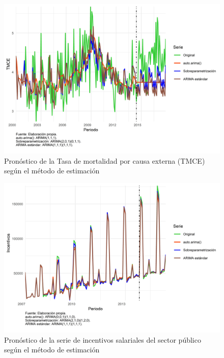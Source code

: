 \documentclass[
]{article}
\begin{document}
\begin{figure}[H]
\includegraphics[width=1\linewidth,height=1\textheight]{Tesis_files/figure-latex/pronostico_EXTERNA-1} \caption{Pronóstico de la Tasa de mortalidad por causa externa (TMCE) según el método de estimación}\label{fig:pronostico_EXTERNA}
\end{figure}

\begin{figure}[H]
\includegraphics[width=1\linewidth,height=1\textheight]{Tesis_files/figure-latex/pronostico_INCENTIVOS-1} \caption{Pronóstico de la serie de incentivos salariales del sector público según el método de estimación}\label{fig:pronostico_INCENTIVOS}
\end{figure}
\end{document}
